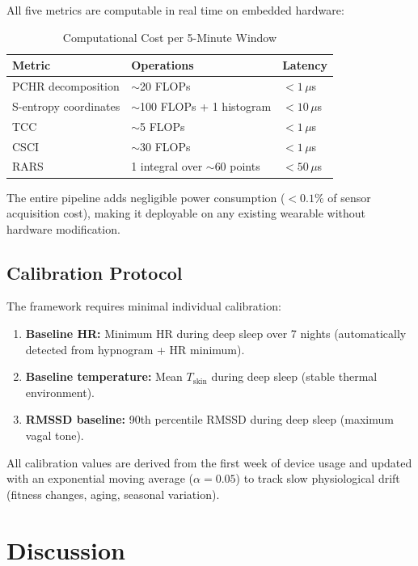 \documentclass[10pt,twocolumn,a4paper]{article}
\theoremstyle{definition}
\begin{document}
All five metrics are computable in real time on embedded hardware:

\begin{table}[H]
\centering
\caption{Computational Cost per 5-Minute Window}
\label{tab:compute}
\begin{tabular}{lll}
\toprule
\textbf{Metric} & \textbf{Operations} & \textbf{Latency}\\
\midrule
PCHR decomposition & $\sim$20 FLOPs & $<1\,\mu$s\\
S-entropy coordinates & $\sim$100 FLOPs + 1 histogram & $<10\,\mu$s\\
TCC & $\sim$5 FLOPs & $<1\,\mu$s\\
CSCI & $\sim$30 FLOPs & $<1\,\mu$s\\
RARS & 1 integral over $\sim$60 points & $<50\,\mu$s\\
\bottomrule
\end{tabular}
\end{table}

The entire pipeline adds negligible power consumption ($< 0.1\%$ of
sensor acquisition cost), making it deployable on any existing wearable
without hardware modification.

\subsection{Calibration Protocol}

The framework requires minimal individual calibration:

\begin{enumerate}[nosep]
\item \textbf{Baseline HR:} Minimum HR during deep sleep over 7 nights
  (automatically detected from hypnogram + HR minimum).
\item \textbf{Baseline temperature:} Mean $T_{\text{skin}}$ during
  deep sleep (stable thermal environment).
\item \textbf{RMSSD baseline:} 90th percentile RMSSD during deep sleep
  (maximum vagal tone).
\end{enumerate}

All calibration values are derived from the first week of device usage
and updated with an exponential moving average ($\alpha = 0.05$) to
track slow physiological drift (fitness changes, aging, seasonal
variation).

\section{Discussion}
\label{sec:discussion}
\end{document}
